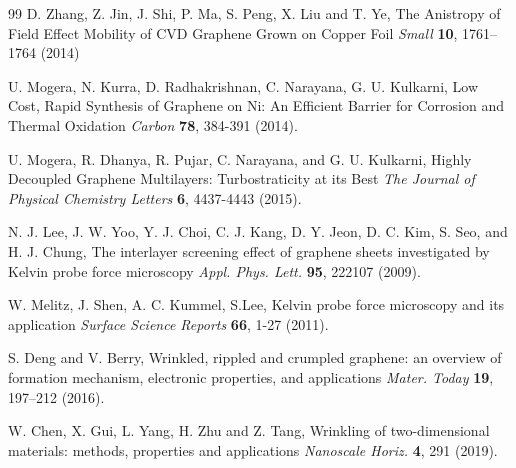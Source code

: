 \documentclass[preprint,aps,preprint,amsmath,amssymb]{revtex4-1}
\begin{document}
\begin{thebibliography} {99}
 D. Zhang, Z. Jin, J. Shi, P. Ma, S. Peng, X. Liu and T. Ye, The Anistropy of Field Effect Mobility of CVD Graphene Grown on Copper Foil \textit{Small} \textbf{10}, 1761–1764 (2014)

 U. Mogera, N. Kurra, D. Radhakrishnan, C. Narayana,
G. U. Kulkarni, Low Cost, Rapid Synthesis of Graphene on Ni: An
Efficient Barrier for Corrosion and Thermal Oxidation \textit{Carbon} \textbf{78}, 384-391 (2014).


 U. Mogera, R. Dhanya, R. Pujar, C. Narayana,
and G. U. Kulkarni, Highly Decoupled Graphene Multilayers: Turbostraticity at its Best \textit{The Journal of Physical Chemistry Letters} \textbf{6}, 4437-4443 (2015).


 N. J. Lee, J. W. Yoo, Y. J. Choi, C. J. Kang, D. Y. Jeon, D. C. Kim, S. Seo, and H. J. Chung, The interlayer screening effect of graphene sheets investigated by Kelvin probe force microscopy \textit{Appl. Phys. Lett.} \textbf{95}, 222107 (2009).

 W. Melitz, J. Shen, A. C. Kummel, S.Lee, Kelvin probe force microscopy and its application \textit{Surface Science Reports} \textbf{66}, 1-27 (2011).

 S. Deng and V. Berry, Wrinkled, rippled and crumpled
graphene: an overview of formation mechanism, electronic properties, and
applications \textit{Mater. Today} \textbf{19}, 197–212 (2016).

 W. Chen, X. Gui, L. Yang, H. Zhu and Z. Tang, Wrinkling of two-dimensional materials: methods, properties and applications \textit{Nanoscale Horiz.} \textbf{4}, 291 (2019).





\end{thebibliography}

 
\end{document}
